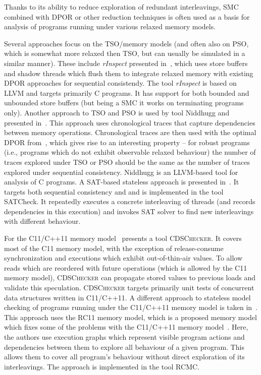 Thanks to its ability to reduce exploration of redundant interleavings, SMC
combined with DPOR or other reduction techniques is often used as a basis for
analysis of programs running under various relaxed memory models.

Several approaches focus on the TSO/\xtso memory models (and often also on PSO,
which is somewhat more relaxed then TSO, but can usually be simulated in a
similar manner).
These include \emph{rInspect} presented in~\cite{Zhang2015}, which uses store
buffers and shadow threads which flush them to integrate relaxed memory with
existing DPOR approaches for sequential consistendy.
The tool \emph{rInspect} is based on LLVM and targets primarily C programs.
It has support for both bounded and unbounded store buffers (but being a SMC it
works on terminating programs only).
Another approach to TSO and PSO is used by tool Niddhugg and presented
in~\cite{Abdulla2015}.
This approach uses chronological traces that capture dependencies between
memory operations.
Chronological traces are then used with the optimal DPOR
from~\cite{Abdulla2014}, which gives rise to an interesting property -- for
robust programs (i.e., programs which do not exhibit observable relaxed
behaviour) the number of traces explored under TSO or PSO should be the same as
the number of traces explored under sequential consistency.
Niddhugg is an LLVM-based tool for analysis of C programs.
A SAT-based stateless approach is presented in~\cite{Demsky2015}.
It targets both sequential consistency and \xtso and is implemented in the tool
SATCheck.
It repeatedly executes a concrete interleaving of threads (and records
dependencies in this execution) and invokes SAT solver to find new
interleavings with different behaviour.

For the C11/C++11 memory model~\cite{Norris2013} presents a tool \textsc{CDSChecker}.
It covers most of the C11 memory model, with the exception of release-consume
synchronization and executions which exhibit out-of-thin-air
values.\footnotemark
To allow reads which are reordered with future operations (which is allowed by
the C11 memory model), \textsc{CDSChecker} can propagate stored values to
previous loads and validate this speculation.
\textsc{CDSChecker} targets primarily unit tests of concurrent data structures
written in C11/C++11.
A different approach to stateless model checking of programs running under the
C11/C++11 memory model is taken in~\cite{Kokologiannakis2017}.
This approach uses the RC11 memory model, which is a proposed memory model
which fixes some of the problems with the C11/C++11 memory
model~\cite{Lahav2017}.
Here, the authors use execution graphs which represent visible program actions
and dependencies between them to explore all behaviour of a given program.
This allows them to cover all program's behaviour without direct exploration of
its interleavings.
The approach is implemented in the tool RCMC.

